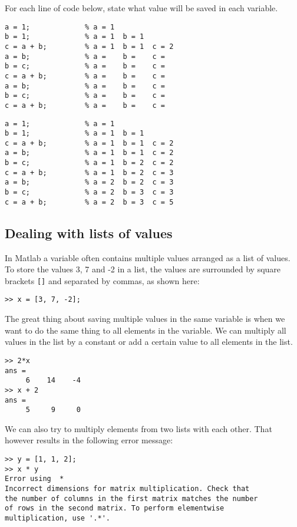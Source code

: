 \begin{ex}
For each line of code below, state what value will be saved in each variable.
\begin{lstlisting}
a = 1;             % a = 1
b = 1;             % a = 1  b = 1 
c = a + b;         % a = 1  b = 1  c = 2
a = b;             % a =    b =    c = 
b = c;             % a =    b =    c = 
c = a + b;         % a =    b =    c = 
a = b;             % a =    b =    c = 
b = c;             % a =    b =    c = 
c = a + b;         % a =    b =    c = 
\end{lstlisting}
\begin{sol}
\begin{lstlisting}
a = 1;             % a = 1
b = 1;             % a = 1  b = 1 
c = a + b;         % a = 1  b = 1  c = 2
a = b;             % a = 1  b = 1  c = 2
b = c;             % a = 1  b = 2  c = 2
c = a + b;         % a = 1  b = 2  c = 3
a = b;             % a = 2  b = 2  c = 3
b = c;             % a = 2  b = 3  c = 3
c = a + b;         % a = 2  b = 3  c = 5
\end{lstlisting}
\end{sol}
\end{ex}




\subsection{Dealing with lists of values}

In Matlab a variable often contains multiple values arranged as a list of values.
To store the values 3, 7 and  -2 in a list, the values are surrounded by square brackets 
\verb![]! and separated by commas, as shown here:
\begin{lstlisting}
>> x = [3, 7, -2];
\end{lstlisting}
The great thing about saving multiple values in the same variable is when we 
want to do the same thing to all elements in the variable.
We can multiply all values in the list by a constant or add a certain value to all 
elements in the list.
\begin{lstlisting}
>> 2*x
ans = 
     6    14    -4
>> x + 2
ans = 
     5     9     0
\end{lstlisting}

We can also try to multiply elements from two lists with each other.
That however results in the following error message:
\begin{lstlisting}
>> y = [1, 1, 2];
>> x * y
Error using  * 
Incorrect dimensions for matrix multiplication. Check that 
the number of columns in the first matrix matches the number 
of rows in the second matrix. To perform elementwise 
multiplication, use '.*'.
\end{lstlisting}

